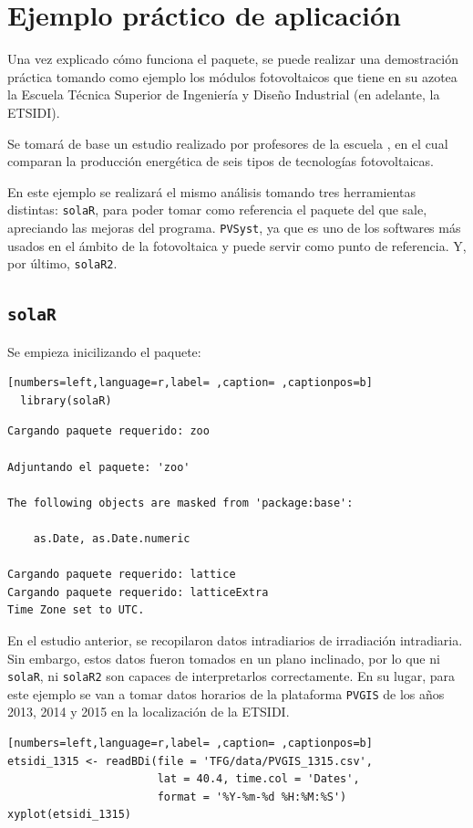\chapter{Ejemplo práctico de aplicación}
\label{chap:ejemplo-practico-aplicacion}
Una vez explicado cómo funciona el paquete, se puede realizar una demostración práctica tomando como ejemplo los módulos fotovoltaicos que tiene en su azotea la Escuela Técnica Superior de Ingeniería y Diseño Industrial (en adelante, la ETSIDI).

Se tomará de base un estudio realizado por profesores de la escuela \cite{adrada17}, en el cual comparan la producción energética de seis tipos de tecnologías fotovoltaicas.

En este ejemplo se realizará el mismo análisis tomando tres herramientas distintas: \texttt{solaR}, para poder tomar como referencia el paquete del que sale, apreciando las mejoras del programa. \texttt{PVSyst}, ya que es uno de los softwares más usados en el ámbito de la fotovoltaica y puede servir como punto de referencia. Y, por último, \texttt{solaR2}.

\section{\texttt{solaR}}
\label{sec:org5bf624d}
\label{sec:solaR}
Se empieza inicilizando el paquete:
\begin{lstlisting}[numbers=left,language=r,label= ,caption= ,captionpos=b]
  library(solaR)
\end{lstlisting}

\begin{verbatim}
Cargando paquete requerido: zoo

Adjuntando el paquete: 'zoo'

The following objects are masked from 'package:base':

    as.Date, as.Date.numeric

Cargando paquete requerido: lattice
Cargando paquete requerido: latticeExtra
Time Zone set to UTC.
\end{verbatim}

En el estudio anterior, se recopilaron datos intradiarios de irradiación intradiaria. Sin embargo, estos datos fueron tomados en un plano inclinado, por lo que ni \texttt{solaR}, ni \texttt{solaR2} son capaces de interpretarlos correctamente. En su lugar, para este ejemplo se van a tomar datos horarios de la plataforma \texttt{PVGIS} \cite{pvgis} de los años 2013, 2014 y 2015 en la localización de la ETSIDI.
\begin{lstlisting}[numbers=left,language=r,label= ,caption= ,captionpos=b]
etsidi_1315 <- readBDi(file = 'TFG/data/PVGIS_1315.csv',
                       lat = 40.4, time.col = 'Dates',
                       format = '%Y-%m-%d %H:%M:%S')
xyplot(etsidi_1315)
\end{lstlisting}

